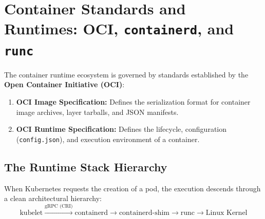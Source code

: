 \section{Container Standards and Runtimes: OCI, \texttt{containerd}, and \texttt{runc}}

The container runtime ecosystem is governed by standards established by the \textbf{Open Container Initiative (OCI)}:
\begin{enumerate}[leftmargin=15pt]
  \item \textbf{OCI Image Specification:} Defines the serialization format for container image archives, layer tarballs, and JSON manifests.
  \item \textbf{OCI Runtime Specification:} Defines the lifecycle, configuration (\texttt{config.json}), and execution environment of a container.
\end{enumerate}

\subsection{The Runtime Stack Hierarchy}
When Kubernetes requests the creation of a pod, the execution descends through a clean architectural hierarchy:
\begin{equation*}
\text{kubelet} \xrightarrow{\text{gRPC (CRI)}} \text{containerd} \xrightarrow{} \text{containerd-shim} \xrightarrow{} \text{runc} \xrightarrow{} \text{Linux Kernel}
\end{equation*}

